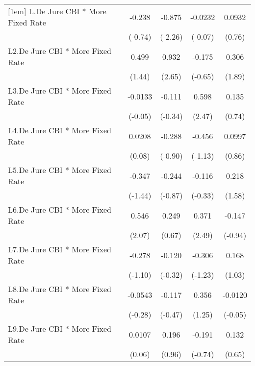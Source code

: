 {\begin{longtable}{l*{4}{c}}
[1em]
L.De Jure CBI * More Fixed Rate&   -0.238         &   -0.875\sym{*}  &  -0.0232         &   0.0932         \\
                &  (-0.74)         &  (-2.26)         &  (-0.07)         &   (0.76)         \\
[1em]
L2.De Jure CBI * More Fixed Rate&    0.499         &    0.932\sym{**} &   -0.175         &    0.306         \\
                &   (1.44)         &   (2.65)         &  (-0.65)         &   (1.89)         \\
[1em]
L3.De Jure CBI * More Fixed Rate&  -0.0133         &   -0.111         &    0.598\sym{*}  &    0.135         \\
                &  (-0.05)         &  (-0.34)         &   (2.47)         &   (0.74)         \\
[1em]
L4.De Jure CBI * More Fixed Rate&   0.0208         &   -0.288         &   -0.456         &   0.0997         \\
                &   (0.08)         &  (-0.90)         &  (-1.13)         &   (0.86)         \\
[1em]
L5.De Jure CBI * More Fixed Rate&   -0.347         &   -0.244         &   -0.116         &    0.218         \\
                &  (-1.44)         &  (-0.87)         &  (-0.33)         &   (1.58)         \\
[1em]
L6.De Jure CBI * More Fixed Rate&    0.546\sym{*}  &    0.249         &    0.371\sym{*}  &   -0.147         \\
                &   (2.07)         &   (0.67)         &   (2.49)         &  (-0.94)         \\
[1em]
L7.De Jure CBI * More Fixed Rate&   -0.278         &   -0.120         &   -0.306         &    0.168         \\
                &  (-1.10)         &  (-0.32)         &  (-1.23)         &   (1.03)         \\
[1em]
L8.De Jure CBI * More Fixed Rate&  -0.0543         &   -0.117         &    0.356         &  -0.0120         \\
                &  (-0.28)         &  (-0.47)         &   (1.25)         &  (-0.05)         \\
[1em]
L9.De Jure CBI * More Fixed Rate&   0.0107         &    0.196         &   -0.191         &    0.132         \\
                &   (0.06)         &   (0.96)         &  (-0.74)         &   (0.65)         \\

\end{longtable}}
